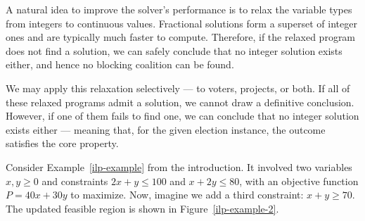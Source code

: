 \documentclass[magisterska,en]{pracamgr}
\begin{document}
A natural idea to improve the solver's performance is to relax the variable types from integers to continuous values. Fractional solutions form a superset of integer ones and are typically much faster to compute. Therefore, if the relaxed program does not find a solution, we can safely conclude that no integer solution exists either, and hence no blocking coalition can be found.

We may apply this relaxation selectively --- to voters, projects, or both. If all of these relaxed programs admit a solution, we cannot draw a definitive conclusion. However, if one of them fails to find one, we can conclude that no integer solution exists either --- meaning that, for the given election instance, the outcome satisfies the core property.

Consider Example~\ref{ilp-example} from the introduction. It involved two variables $x,y\geq0$ and constraints $2x+y\leq100$ and $x+2y\leq80$, with an objective function $P=40x+30y$ to maximize. Now, imagine we add a third constraint: $x+y\geq70$. The updated feasible region is shown in Figure~\ref{ilp-example-2}.
\end{document}
